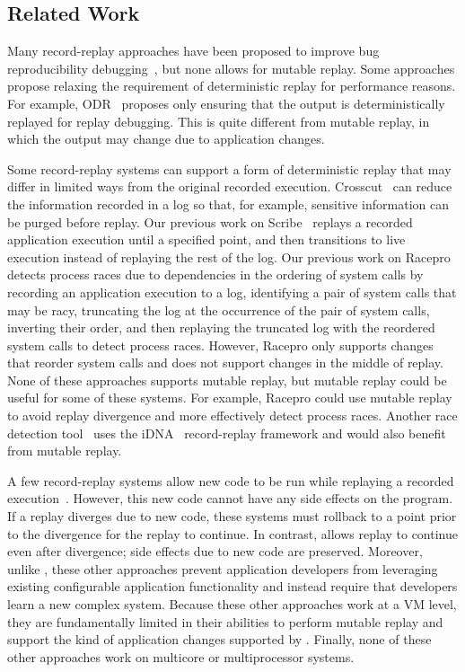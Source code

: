 \subsection{Related Work}
\label{sec:related}

Many record-replay approaches have been proposed to improve bug 
reproducibility
debugging~\cite{idna:vee06,decouple:usenix08,instant-replay,r2:osdi,odr:sosp09,pinsel:pldi07,pres:sosp09,jockey,srinivasan:flashback,subhraveti:sigmetrics11},
but none allows for mutable replay. Some
approaches
propose relaxing the requirement of deterministic replay for performance
reasons. For example, ODR~\cite{odr:sosp09} proposes only ensuring that the
output is deterministically replayed for replay debugging. This is
quite different from mutable replay, in which the output may
change due to application changes.

Some record-replay systems can support a form of deterministic replay
that may differ in limited ways from the original recorded
execution. Crosscut~\cite{crosscut} can reduce the information
recorded in a log
so that, for example, sensitive information can be
purged before
replay. Our previous work on Scribe~\cite{scribe:sigmetrics10} replays a recorded
application execution until a specified
point, and then transitions to
live execution instead of replaying the rest of the
log. Our previous work on Racepro~\cite{racepro:sosp11} detects process races due to
dependencies in the ordering of system calls by recording an
application execution to a log, identifying a pair of system calls
that may be racy, truncating the log at the occurrence of the pair of
system calls, inverting their order, and then replaying the truncated
log with the reordered system calls to detect process
races.  However, Racepro only supports changes that reorder system calls and
does not support changes in the middle of replay.
None of these approaches supports mutable replay,
but mutable replay could be useful for some of these systems.  For
example, Racepro could use mutable replay to avoid replay
divergence and more effectively detect process races.  Another race
detection tool~\cite{pinsel:pldi07} uses the iDNA~\cite{idna:vee06}
record-replay framework and would also benefit from mutable replay.

A few record-replay systems allow new code to be run while replaying a recorded
execution~\cite{intrusions:sosp05,decouple:usenix08}. However, this new code
cannot have any side effects on the program.  If a replay diverges due to new
code, these systems must rollback to a point prior to the divergence for the
replay to continue.  In contrast, {\dora} allows replay to continue even
after divergence; side effects due to new code are preserved.  Moreover, unlike
{\dora}, these other approaches prevent application developers from leveraging existing
configurable application functionality and instead require that developers learn
a new complex system. Because these other approaches work at a VM level, they are
fundamentally limited in their abilities to perform mutable replay and support
the kind of application changes supported by {\dora}. Finally, none of these
other approaches work on multicore or multiprocessor systems.

